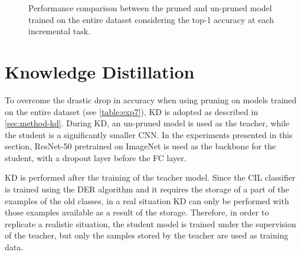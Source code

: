 \begin{figure}[H]
	\centering
	\caption{Performance comparison between the pruned and un-pruned model trained on the entire dataset considering the top-1 accuracy at each incremental task.}%
	\label{fig:exp7}
\end{figure}



\section{Knowledge Distillation}
\label{sec:exp-kd}
To overcome the drastic drop in accuracy when using pruning on models trained on the entire dataset (see \autoref{table:exp7}), KD is adopted as described in \autoref{sec:method-kd}.
During KD, an un-pruned model is used as the teacher, while the student is a significantly smaller CNN. In the experiments presented in this section, ResNet-50 pretrained on ImageNet is used as the backbone for the student, with a dropout layer before the FC layer.

KD is performed after the training of the teacher model.
Since the CIL classifier is trained using the DER algorithm and it requires the storage of a part of the examples of the old classes, in a real situation KD can only be performed with those examples available as a result of the storage.
Therefore, in order to replicate a realistic situation, the student model is trained under the supervision of the teacher, but only the samples stored by the teacher are used as training data.

